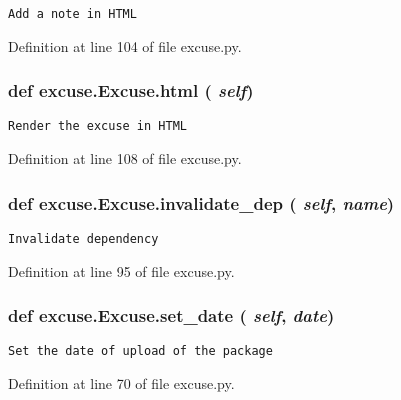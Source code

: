\footnotesize\begin{verbatim}Add a note in HTML\end{verbatim}
\normalsize
 

Definition at line 104 of file excuse.py.
\subsubsection{\setlength{\rightskip}{0pt plus 5cm}def excuse.Excuse.html ( {\em self})}\label{classexcuse_1_1Excuse_84049740652a58b248fabdb3fa9d4b2c}




\footnotesize\begin{verbatim}Render the excuse in HTML\end{verbatim}
\normalsize
 

Definition at line 108 of file excuse.py.
\subsubsection{\setlength{\rightskip}{0pt plus 5cm}def excuse.Excuse.invalidate\_\-dep ( {\em self},  {\em name})}\label{classexcuse_1_1Excuse_8594c46ccf4182fa8b37fe487bf53850}




\footnotesize\begin{verbatim}Invalidate dependency\end{verbatim}
\normalsize
 

Definition at line 95 of file excuse.py.
\subsubsection{\setlength{\rightskip}{0pt plus 5cm}def excuse.Excuse.set\_\-date ( {\em self},  {\em date})}\label{classexcuse_1_1Excuse_ac01c3b9802ad26571f01b55ffc1098c}




\footnotesize\begin{verbatim}Set the date of upload of the package\end{verbatim}
\normalsize
 

Definition at line 70 of file excuse.py.
